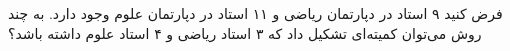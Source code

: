 \p
فرض کنید ۹ استاد در دپارتمان ریاضی و ۱۱ استاد در دپارتمان علوم وجود دارد. به چند روش می‌توان کمیته‌ای تشکیل داد که ۳ استاد ریاضی و ۴ استاد علوم داشته باشد؟